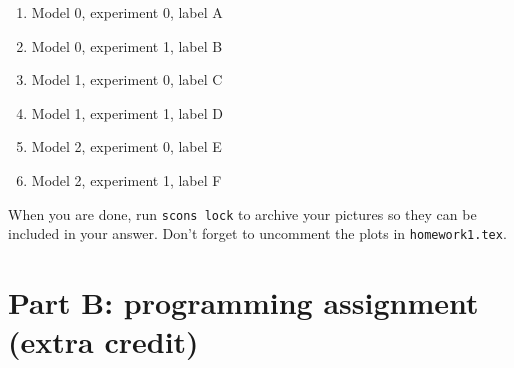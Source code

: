 \begin{enumerate}

\item Model 0, experiment 0, label A

\item Model 0, experiment 1, label B

\item Model 1, experiment 0, label C

\item Model 1, experiment 1, label D

\item Model 2, experiment 0, label E

\item Model 2, experiment 1, label F

\end{enumerate}

When you are done, run \texttt{scons lock} to archive your pictures 
so they can be included in your answer.
Don't forget to uncomment the plots in \texttt{homework1.tex}.



\section{Part B: programming assignment (extra credit)}

